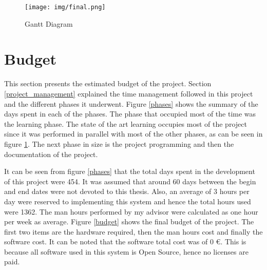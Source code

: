 \begin{appendices}
		\begin{figure}[H]
			\centering
		    \texttt{[image: img/final.png]}
			\caption[Gantt Diagram]{Gantt Diagram}	
			\label{gantt_diagram}
		\end{figure}

\newpage
	\chapter{Budget}
		This section presents the estimated budget of the project. 
		Section \ref{project_management} explained the time management followed in this project and the different phases it underwent. 
		Figure \ref{phases} shows the summary of the days spent in each of the phases. 
		The phase that occupied most of the time was the learning phase. 
		The state of the art learning occupies most of the project since it was performed in parallel with most of the other phases, as can be seen in figure \ref{gantt_diagram}. 
		The next phase in size is the project programming and then the documentation of the project. 





		It can be seen from figure \ref{phases} that the total days spent in the development of this project were 454. 
		It was assumed that around 60 days between the begin and end dates were not devoted to this thesis. 
		Also, an average of 3 hours per day were reserved to implementing this system and hence the total hours used were 1362. 
		The man hours performed by my advisor were calculated as one hour per week as average. 
		Figure \ref{budget} shows the final budget of the project. 
		The first two items are the hardware required, then the man hours cost and finally the software cost. 
		It can be noted that the software total cost was of 0 \euro. 
		This is because all software used in this system is Open Source, hence no licenses are paid. 




\end{appendices}
